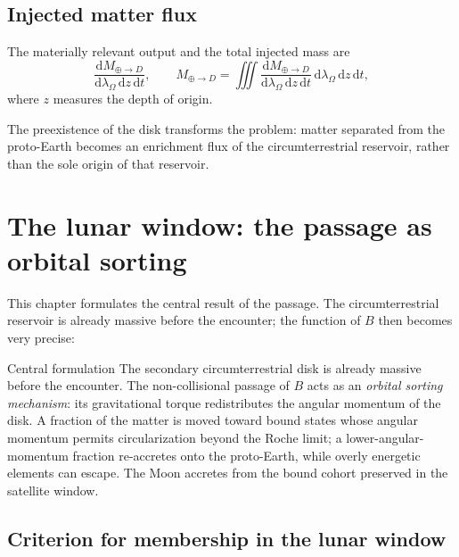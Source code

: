 \documentclass[11pt,a4paper,openany]{report}
\newcommand{\dd}{\mathrm{d}}
\begin{document}
\section{Injected matter flux}

The materially relevant output and the total injected mass are
\begin{equation}
\frac{\dd M_{\oplus\to D}}{\dd\lambda_\Omega\,\dd z\,\dd t},
\qquad
M_{\oplus\to D}=\iiint\frac{\dd M_{\oplus\to D}}{\dd\lambda_\Omega\,\dd z\,\dd t}\,
\dd\lambda_\Omega\,\dd z\,\dd t,
\label{eq:flux}
\end{equation}
where $z$ measures the depth of origin.

\begin{ideephys}
The preexistence of the disk transforms the problem: matter separated from the proto-Earth becomes
an enrichment flux of the circumterrestrial reservoir, rather than the sole origin of that reservoir.
\end{ideephys}

\chapter{The lunar window: the passage as orbital sorting}
\label{ch:fenetre}

This chapter formulates the central result of the passage. The circumterrestrial reservoir is
already massive before the encounter; the function of $B$ then becomes very precise:

\begin{principe}{Central formulation}
The secondary circumterrestrial disk is already massive before the encounter. The non-collisional
passage of $B$ acts as an \emph{orbital sorting mechanism}: its gravitational torque redistributes
the angular momentum of the disk. A fraction of the matter is moved toward bound states whose
angular momentum permits circularization beyond the Roche limit; a lower-angular-momentum fraction
re-accretes onto the proto-Earth, while overly energetic elements can escape. The Moon accretes
from the bound cohort preserved in the satellite window.
\end{principe}

\section{Criterion for membership in the lunar window}
\end{document}
